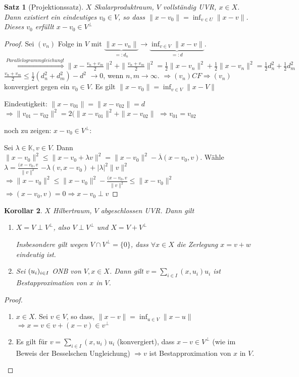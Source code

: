 \documentclass[ngerman]{report}
\theoremstyle{plain}%
\newtheorem{thm}{Satz}[chapter]
\newtheorem{cor}[thm]{Korollar}
\theoremstyle{definition}%
\theoremstyle{myStyle}
\newcommand{\K}{\mathbb{K}}
\newcommand{\norm}[1]{\|#1\|}
\newcommand{\df}[1][]{%
	\overset{#1}{\Rightarrow}
}
\begin{document}
	\begin{thm}[Projektionssatz]
		$X$ Skalarproduktraum, $V$ vollständig UVR, $x\in X$. Dann existiert ein eindeutiges $v_0 \in V$, so dass $\norm{x - v_0} = \inf_{v\in U} \norm{x - v}$. Dieses $v_0$ erfüllt $x - v_0 \in V^\perp$	
	\end{thm}
	\begin{proof}
		Sei $(v_n)$ Folge in $V$ mit $\underbrace{\norm{x-v_n}}_{=: d_n} \to \underbrace{\inf_{v\in V}\norm{x-v}}_{=: d}.$
		$\df[Parallelogrammgleichung!] \norm{x - \frac{v_n+v_m}{2}}^2 + \norm{\frac{v_n+v_m}{2}}^2
		= \frac{1}{2}\norm{x- v_n}^2 + \frac{1}{2}\norm{x-v_n}^2 = \frac{1}{2} d_n^2 + \frac{1}{2} d_m^2$
	$\frac{v_n+v_m}{2} \leq \frac{1}{2} (d_n^2 + d_m^2) - d^2$ $\to 0$, wenn $n,m \to \infty$.
	$\df (v_n) CF \df (v_n)$ konvergiert gegen ein $v_0 \in V$.
	Es gilt $\norm{x-v_0} = \inf_{v\in V}\norm{x-V}$ \par
	Eindeutigkeit: $\norm{x - v_{01}} = \norm{x - v_{02}}	= d$
	$\df \norm{v_{01} - v_{02}}^2 = 2(\norm{x - v_{01}}^2 + \norm{x - v_{02}} $
	$\df v_{01} = v_{02}$\par
	noch zu zeigen: $x-v_0 \in V^\perp:$\par
	Sei $\lambda\in \K, v\in V$. Dann $\norm{x - v_{0}}^2 \leq \norm{x - v_{0} + \lambda v}^2
	= \norm{x - v_{0}}^2 - \overline{\lambda}(x-v_0,v)$.
	Wähle $\lambda = \frac{(x-v_0,v}{\norm{v}^2}$ $-\lambda(v,x-v_0) + |\lambda|^2\norm{v}^2$
	$\df \norm{x - v_{0}}^2 \leq \norm{x - v_{0}}^2 - \frac{(x-v_0,v}{\norm{v}^2} \leq \norm{x - v_{0}}^2$	
	$\df (x-v_0,v) = 0 \df x-v_0 \perp v$
	\end{proof}
	
	\begin{cor}
		$X$ Hilbertraum, $V$ abgeschlossen UVR. Dann gilt 
			\begin{enumerate}
				\item $X = V \perp V^\perp$, also $ V\perp V^\perp$ und $X = V + V^\perp$\par
				Insbesondere gilt wegen $V\cap V^\perp = \{0\}$, dass $\forall x\in X$ die Zerlegung $x = v + w$ eindeutig ist.
				\item Sei $(u_i)_{i\in I}$ ONB von $V, x\in X$. Dann gilt 
				$v = \sum_{i\in I} (x,u_i) u_i$ ist Bestapproximation von $x$ in $V$.
			\end{enumerate}
	\end{cor}

	\begin{proof}
		\begin{enumerate}
			\item $x\in X$. Sei $v\in V$, so dass, $\norm{x-v} = \inf_{u\in V}\norm{x-u}$
			$\df x = v \in v+ (x-v) \in v^\perp$
			\item Es gilt für $v = \sum_{i\in I} (x, u_i) u_i$ (konvergiert), dass $x -v \in V^\perp$
			(wie im Beweis der Besselschen Ungleichung)
			$\df v$ ist Bestapproximation von $x$ in $V$.
		\end{enumerate}
	\end{proof}
\end{document}
